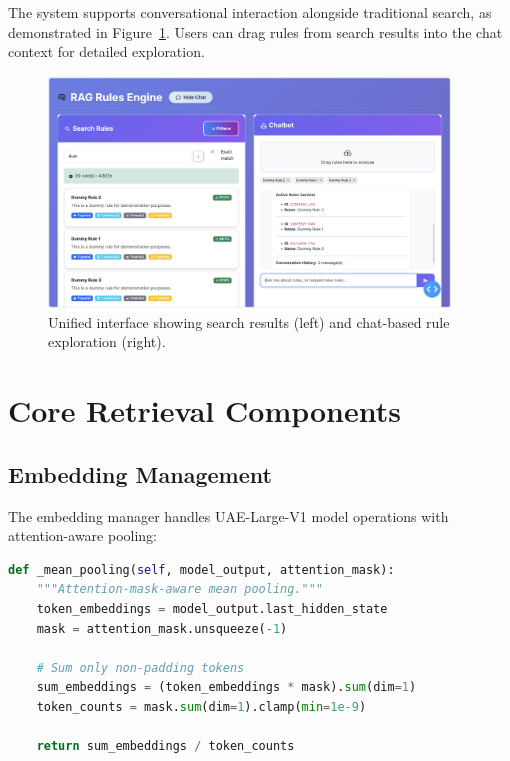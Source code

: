 The system supports conversational interaction alongside traditional search, as demonstrated in Figure~\ref{fig:search-chat}. Users can drag rules from search results into the chat context for detailed exploration.

\begin{figure}[!htbp]
\centering
\includegraphics[width=0.95\textwidth]{Figures/search_chat_example.png}
\caption{Unified interface showing search results (left) and chat-based rule exploration (right).}
\label{fig:search-chat}
\end{figure}

\section{Core Retrieval Components}

\subsection{Embedding Management}

The embedding manager handles UAE-Large-V1 model operations with attention-aware pooling:

\begin{lstlisting}[language=Python, caption={Mean pooling implementation for embeddings}, label={lst:mean-pooling}]
def _mean_pooling(self, model_output, attention_mask):
    """Attention-mask-aware mean pooling."""
    token_embeddings = model_output.last_hidden_state
    mask = attention_mask.unsqueeze(-1)
    
    # Sum only non-padding tokens
    sum_embeddings = (token_embeddings * mask).sum(dim=1)
    token_counts = mask.sum(dim=1).clamp(min=1e-9)
    
    return sum_embeddings / token_counts
\end{lstlisting}

